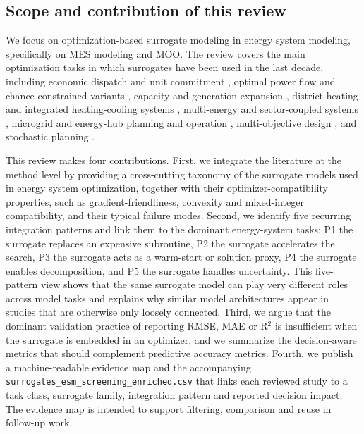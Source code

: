 \documentclass[final,5p,times,twocolumn]{elsarticle}
\begin{document}
\subsection{Scope and contribution of this review}
\label{sec:intro:scope}

We focus on optimization-based surrogate modeling in energy system
modeling, specifically on MES modeling and MOO. The review covers the
main optimization tasks in which surrogates have been used in the last
decade, including economic dispatch and unit commitment
\cite{Wu2022231,Chen20244723,Chen2022,Nikolaidis2021,Lu20232989,Safta20172535,Wang20211767,Pang2023},
optimal power flow and chance-constrained variants
\cite{Muhlpfordt20194806,Su2022315,Deng2020831,Liu20223726,Chen2023657,Koirala20242284,Xu20212696,Srithapon202134395,Urgun20202791},
capacity and generation expansion
\cite{Rodgers2018951,Jahangiri20244849,Jahangiri2023,Han2018622,Fu20202904,Fu2022},
district heating and integrated heating-cooling systems
\cite{Koschwitz2018134,Zhou2024,Jia2022553,Hirvonen2017323,Reynolds2017704,Gao2025,Petrova2025},
multi-energy and sector-coupled systems
\cite{Zhou20181,Zheng20231907,Ren2024,Jalving2023,Dong2023,Yin2024},
microgrid and energy-hub planning and operation
\cite{Faraji2020157284,Nematollahi2021,Wang20192635,Hussien20211883,Rigo-Mariani20171762,Cao2023__2,Li2023__3},
multi-objective design
\cite{Thrampoulidis2021,Hussien20211883,Schulte2020,Han2018622},
and stochastic planning
\cite{Zhou20181,Fu20202904,Fu2022,Yang2024,Dong2022,Chen2023657,Xu20212696,Liang20246508,Dong2023}.

This review makes four contributions. First, we integrate the literature
at the method level by providing a cross-cutting taxonomy of the
surrogate models used in energy system optimization, together with their
optimizer-compatibility properties, such as gradient-friendliness,
convexity and mixed-integer compatibility, and their typical failure
modes. Second, we identify five recurring integration patterns and link
them to the dominant energy-system tasks: P1 the surrogate replaces an
expensive subroutine, P2 the surrogate accelerates the search, P3 the
surrogate acts as a warm-start or solution proxy, P4 the surrogate
enables decomposition, and P5 the surrogate handles uncertainty. This
five-pattern view shows that the same surrogate model can play very
different roles across model tasks and explains why similar model
architectures appear in studies that are otherwise only loosely
connected. Third, we argue that the dominant validation practice of
reporting RMSE, MAE or R$^2$ is insufficient when the surrogate is
embedded in an optimizer, and we summarize the decision-aware metrics
that should complement predictive accuracy metrics. Fourth, we publish a
machine-readable evidence map and the accompanying
\texttt{surrogates_esm_screening_enriched.csv} that links each reviewed study
to a task class, surrogate family, integration pattern and reported
decision impact. The evidence map is intended to support filtering,
comparison and reuse in follow-up work.
\end{document}
